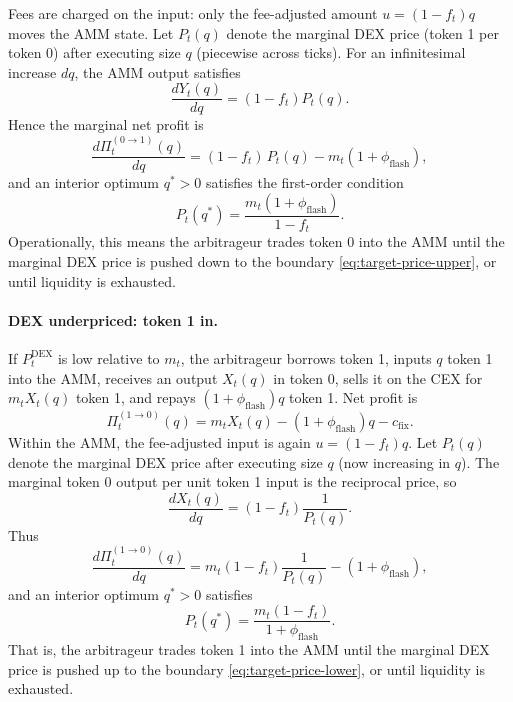\documentclass[11pt]{article}
\begin{document}
Fees are charged on the input: only the fee-adjusted amount $u=(1-f_t)q$
moves the AMM state. Let $P_t(q)$ denote the marginal DEX price (token 1 per token 0)
after executing size $q$ (piecewise across ticks). For an infinitesimal increase $dq$, the AMM output
satisfies
\begin{equation}
  \frac{dY_t(q)}{dq} = (1-f_t)P_t(q).
  \label{eq:dYdq}
\end{equation}
Hence the marginal net profit is
\begin{equation}
  \frac{d\Pi_t^{(0\rightarrow 1)}(q)}{dq}
  =
  (1-f_t)\,P_t(q)- m_t(1+\phi_{\mathrm{flash}}),
  \label{eq:marginal-0in}
\end{equation}
and an interior optimum $q^*>0$ satisfies the first-order condition
\begin{equation}
  P_t(q^*) = \frac{m_t(1+\phi_{\mathrm{flash}})}{1-f_t}.
  \label{eq:target-price-upper}
\end{equation}
Operationally, this means the arbitrageur trades token 0 into the AMM until the marginal DEX price is
pushed down to the boundary \eqref{eq:target-price-upper}, or until liquidity is exhausted.

\paragraph{DEX underpriced: token 1 in.}
If $P_t^{\mathrm{DEX}}$ is low relative to $m_t$, the arbitrageur borrows token 1, inputs $q$ token 1
into the AMM, receives an output $X_t(q)$ in token 0, sells it on the CEX for $m_t X_t(q)$ token 1, and
repays $(1+\phi_{\mathrm{flash}})q$ token 1. Net profit is
\begin{equation}
  \Pi_t^{(1\rightarrow 0)}(q)
  =
  m_tX_t(q) - (1+\phi_{\mathrm{flash}})q - c_{\mathrm{fix}}.
  \label{eq:arb-profit-1in}
\end{equation}
Within the AMM, the fee-adjusted input is again $u=(1-f_t)q$. Let $P_t(q)$ denote the marginal DEX price
after executing size $q$ (now increasing in $q$). The marginal token 0 output per unit token 1 input is
the reciprocal price, so
\begin{equation}
  \frac{dX_t(q)}{dq}
  =
  (1-f_t)\frac{1}{P_t(q)}.
  \label{eq:dXdq}
\end{equation}
Thus
\begin{equation}
  \frac{d\Pi_t^{(1\rightarrow 0)}(q)}{dq}
  =
  m_t(1-f_t)\frac{1}{P_t(q)} - (1+\phi_{\mathrm{flash}}),
  \label{eq:marginal-1in}
\end{equation}
and an interior optimum $q^*>0$ satisfies
\begin{equation}
  P_t(q^*) = \frac{m_t(1-f_t)}{1+\phi_{\mathrm{flash}}}.
  \label{eq:target-price-lower}
\end{equation}
That is, the arbitrageur trades token 1 into the AMM until the marginal DEX price is pushed up to the
boundary \eqref{eq:target-price-lower}, or until liquidity is exhausted.
\end{document}
